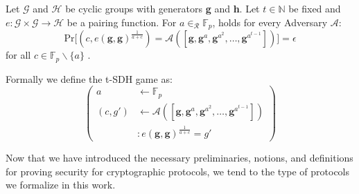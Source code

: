\begin{definition}
    Let $\mathcal{G}$ and $\mathcal{H}$ be cyclic groups with generators \textbf{g} and \textbf{h}.
    Let $t \in \mathbb{N}$ be fixed and $e: \mathcal{G} \times \mathcal{G} \rightarrow \mathcal{H}$ be a pairing function.  For $a \in_{\mathcal{R}} \mathbb{F}_p$, holds for every Adversary $\mathcal{A}:$
    \begin{equation*}
        \text{Pr}\big[
            (c,e(\textbf{g}, \textbf{g} )^{\frac{1}{a+c}}) = \mathcal{A}([\textbf{g},\textbf{g}^a,\textbf{g}^{a^2},\dots, \textbf{g}^{a^{t-1}}])
        \big] = \epsilon
    \end{equation*}
    for all $c \in \mathbb{F}_p\backslash \{a\}$ \parencite{KZG}.
    
    Formally we define the t-SDH game as: 
    \begin{equation*}
        \left(
            \begin{aligned}
                a & \leftarrow \mathbb{F}_p \\
                (c,g') & \leftarrow \mathcal{A}([\textbf{g},\textbf{g}^a,\textbf{g}^{a^2},\dots, \textbf{g}^{a^{t-1}}]) \\
                & : e(\textbf{g}, \textbf{g})^{\frac{1}{a+c}} = g'
            \end{aligned}
        \right)
    \end{equation*}
\end{definition}

Now that we have introduced the necessary preliminaries, notions, and definitions for proving security for cryptographic protocols, we tend to the type of protocols we formalize in this work.

